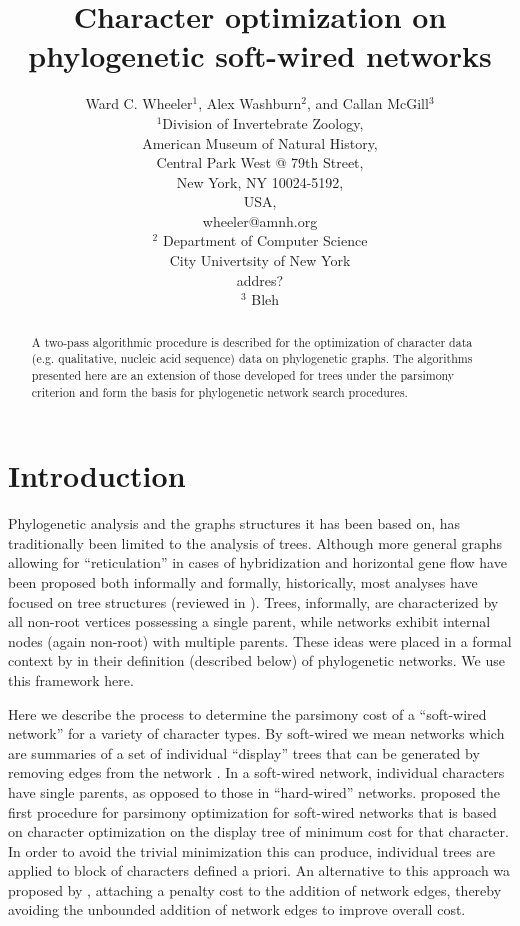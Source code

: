 \documentclass[12pt]{article}
\title{Character optimization on phylogenetic soft-wired networks}
\author{Ward C. Wheeler$^1$, Alex Washburn$^2$, and Callan McGill$^3$\\
		$^1$Division of Invertebrate Zoology,\\
		American Museum of Natural History,\\
		Central Park West @ 79th Street,\\
		New York, NY 10024-5192,\\
		USA,\\
		wheeler@amnh.org\\
	    $^2$ Department of Computer Science\\
        City Univertsity of New York\\
        addres?\\
        $^3$ Bleh}
\begin{document}
\maketitle
\newpage
\doublespace
\begin{abstract}
	A two-pass algorithmic procedure is described for the optimization of character data (e.g. qualitative, nucleic acid sequence) data
	on phylogenetic graphs.  The algorithms presented here are an extension of those developed for trees under the parsimony criterion
	and form the basis for phylogenetic network search procedures. 
\end{abstract}
\newpage
\tableofcontents
\newpage

\section{Introduction} \label{Introduction}
Phylogenetic analysis and the graphs structures it has been based on, has traditionally been limited to the analysis of trees.
Although more general graphs allowing for ``reticulation'' in cases of hybridization and horizontal gene flow have been proposed both informally and formally, historically, most analyses have focused on tree structures (reviewed in \citealp{Wheeler2012}).
Trees, informally, are characterized by all non-root vertices possessing a single parent, while networks exhibit internal nodes (again non-root) with multiple parents.
These ideas were placed in a formal context by \cite{moretetal2004} in their definition (described below) of phylogenetic networks.
We use this framework here.

Here we describe the process to determine the parsimony cost of a ``soft-wired network'' for a variety of character types.
By soft-wired we mean networks which are summaries of a set of individual ``display'' trees that can be generated by removing edges from the network \citep{Nakhlehetal2005, KannanandWheeler2012, Fischeretal2013}.
In a soft-wired network, individual characters have single parents, as opposed to those in ``hard-wired'' networks.  \cite{Nakhlehetal2005} proposed the first procedure for parsimony optimization for soft-wired networks that is based on character optimization on the display tree of minimum cost for that character. 
In order to avoid the trivial minimization this can produce, individual trees are applied to block of characters defined a priori.
An alternative to this approach wa proposed by \cite{Wheeler2015}, attaching a penalty cost to the addition of network edges, thereby avoiding the unbounded addition of network edges to improve overall cost.
\end{document}
